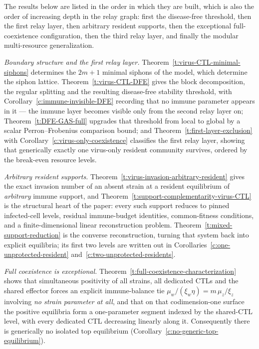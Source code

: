 
The results below are listed in the order in which they are built, which is also the order of increasing
depth in the relay graph: first  the disease-free threshold, then the first relay
layer, then arbitrary resident supports, then the exceptional full-coexistence configuration, then the third
relay layer, and finally the modular multi-resource generalization.

\emph{Boundary structure and the first relay layer.}
Theorem~\ref{t:virus-CTL-minimal-siphons} determines the $2m+1$ minimal siphons of the model, which determine the
siphon lattice.
Theorem~\ref{t:virus-CTL-DFE} gives the block decomposition, the regular splitting and the
resulting disease-free stability threshold, with Corollary~\ref{c:immune-invisible-DFE} recording that no immune
parameter appears in it --- the immune layer becomes visible only from the second relay layer on;
Theorem~\ref{t:DFE-GAS-full} upgrades that threshold from local to global by a scalar Perron--Frobenius
comparison bound; and Theorem~\ref{t:first-layer-exclusion} with
Corollary~\ref{c:virus-only-coexistence} classifies the first relay layer, showing that generically exactly
one virus-only resident community survives, ordered by the break-even resource levels.

\emph{Arbitrary resident supports.}
Theorem~\ref{t:virus-invasion-arbitrary-resident} gives the exact invasion number of an absent strain at a
resident equilibrium of \emph{arbitrary} immune support, and
Theorem~\ref{t:support-complementarity-virus-CTL} is the structural heart of the paper: every such support
reduces to pinned infected-cell levels, residual immune-budget identities, common-fitness conditions, and a
finite-dimensional linear reconstruction problem. Theorem~\ref{t:mixed-support-reduction} is the converse
reconstruction, turning that system back into explicit equilibria; its first two levels are written out in
Corollaries~\ref{c:one-unprotected-resident} and~\ref{c:two-unprotected-residents}.

\emph{Full coexistence is exceptional.}
Theorem~\ref{t:full-coexistence-characterization} shows that simultaneous positivity of all strains, all
dedicated CTLs and the shared effector forces an explicit immune-balance tie
$\mu_w/(\xi_w\eta)=m\,\mu_z/\xi_z$ involving \emph{no strain parameter at all}, and that on that
codimension-one surface the positive equilibria form a one-parameter segment indexed by the shared-CTL level,
with every dedicated CTL decreasing linearly along it. Consequently there is generically no isolated top
equilibrium (Corollary~\ref{c:no-generic-top-equilibrium}).

